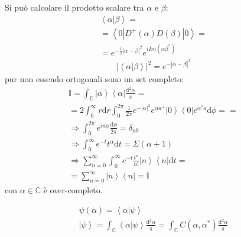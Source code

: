 Si può calcolare il prodotto scalare tra $\alpha$ e $\beta$:
\begin{equation}\begin{split}
\left\langle \alpha|\beta \right\rangle=\\
=\left\langle 0|D^+\left(\alpha\right)D\left(\beta\right)|0 \right\rangle=\\
=e^{-\frac{1}{2}|\alpha-\beta|^2}e^{i Im{\left(\alpha\beta^*\right)}}
\end{split}\end{equation}
\begin{equation}\begin{split}
|\left\langle \alpha|\beta \right\rangle|^2=e^{-|\alpha-\beta|^2}
\end{split}\end{equation}
pur non essendo ortogonali sono un set completo:
\begin{equation}\begin{split}
\mathbb{I}=\int_{\mathbb{C} }{\left |\alpha \right\rangle\left\langle \alpha\right |\frac{\textrm{d}^2\alpha}{\pi }}=\\
=2\int_{0}^{\infty }{r \textrm{d}r}\int_{0}^{2\pi }{\frac{1}{2\pi }e^{-|\alpha|^2}e^{\alpha a^+}\left |0 \right\rangle\left\langle 0\right | e^{\alpha^*a}\textrm{d}\phi }=
= \\
\Longrightarrow \int_{0}^{2\pi }{e^{in\phi } \frac{\textrm{d}\phi}{2\pi }}=\delta_{n0}\\
\Longrightarrow \int_{0}^{\infty }{e^{-t}t^{\alpha} \textrm{d}t}=\Sigma\left(\alpha +1\right)\\
\Longrightarrow \sum_{n=0}^{\infty }{\int_{0}^{\infty }{e^{-t}\frac{t^n}{n!}\left |n \right\rangle\left\langle n\right | \textrm{d}t}}=\\
=\sum_{n=0}^{\infty }\left |n \right\rangle\left\langle n\right |=\mathbb{I}
\end{split}\end{equation}
con $\alpha\in\mathbb{C} $ è over-completo.

\begin{equation}\begin{split}
\psi \left(\alpha\right)=\left\langle \alpha|\psi  \right\rangle\\
\left |\psi  \right\rangle=\int_{\mathbb{C} }{\left\langle \alpha|\psi  \right\rangle\frac{\textrm{d}^2\alpha}{\pi }}=\int_{\mathbb{C} }{C\left(\alpha,\alpha^*\right)\frac{\textrm{d}^2\alpha}{\pi }}
\end{split}\end{equation}


